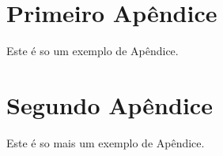 \documentclass[
  fleqn,ebook]{ic}
\begin{document}
  

\hypertarget{appendix-appendix}{%
\appendix}


\hypertarget{primeiro-apuxeandice}{%
\section{Primeiro Apêndice}\label{primeiro-apuxeandice}}

Este é so um exemplo de Apêndice.

\hypertarget{segundo-apuxeandice}{%
\section{Segundo Apêndice}\label{segundo-apuxeandice}}

Este é so mais um exemplo de Apêndice.
\end{document}
